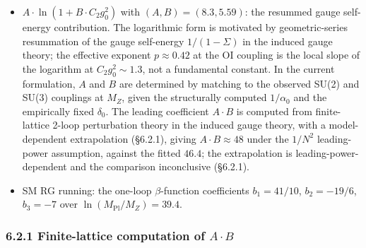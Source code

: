 \documentclass[
]{article}
\begin{document}
\begin{itemize}
  \(\delta_0 = 10.02\) is therefore required by self-consistency of the
  framework; whether the precise \(\text{Tr}[Y^2] = 10\) coincidence for
  the U(1) row is a numerical accident or reflects higher-order
  structural physics --- substratum-level mode-counting on the cubic
  lattice, non-perturbative effects in the discrete substratum measure
  (§6.5), or lattice topological invariants beyond the framework's
  currently-developed scope --- remains open and is treated as numerical
  pending such structural mechanisms. The coincidence holds in the
  matching convention \(\mu = M_{\text{Pl}}\) of §6.2 and not
  independently of it: matching at the lattice scale
  \(1/\epsilon_{\rm lat}\) moves \(\delta_0\) by
  \(0.65\ln\sqrt{6\sigma}\), to \(\delta_0 \approx 10.60\) at
  \(\sigma = 1\).
\item
  \(A \cdot \ln(1 + B \cdot C_2 g_0^2)\) with \((A, B) = (8.3, 5.59)\):
  the resummed gauge self-energy contribution. The logarithmic form is
  motivated by geometric-series resummation of the gauge self-energy
  \(1/(1 - \Sigma)\) in the induced gauge theory; the effective exponent
  \(p \approx 0.42\) at the OI coupling is the local slope of the
  logarithm at \(C_2 g_0^2 \sim 1.3\), not a fundamental constant. In
  the current formulation, \(A\) and \(B\) are determined by matching to
  the observed SU(2) and SU(3) couplings at \(M_Z\), given the
  structurally computed \(1/\alpha_0\) and the empirically fixed
  \(\delta_0\). The leading coefficient \(A \cdot B\) is computed from
  finite-lattice 2-loop perturbation theory in the induced gauge theory,
  with a model-dependent extrapolation (§6.2.1), giving
  \(A \cdot B \approx 48\) under the \(1/N^2\) leading-power assumption,
  against the fitted \(46.4\); the extrapolation is
  leading-power-dependent and the comparison inconclusive (§6.2.1).
\item
  SM RG running: the one-loop \(\beta\)-function coefficients
  \(b_1 = 41/10\), \(b_2 = -19/6\), \(b_3 = -7\) over
  \(\ln(M_{\text{Pl}}/M_Z) = 39.4\).
\end{itemize}

\hypertarget{finite-lattice-computation-of-a-cdot-b}{%
\subsubsection{\texorpdfstring{6.2.1 Finite-lattice computation of
\(A \cdot B\)}{6.2.1 Finite-lattice computation of A \textbackslash cdot B}}\label{finite-lattice-computation-of-a-cdot-b}}
\end{document}

